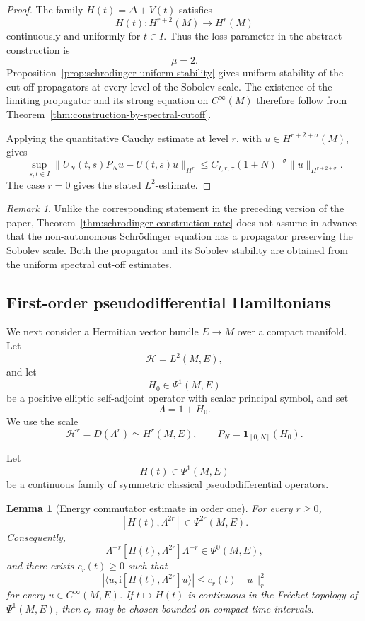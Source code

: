 \documentclass[11pt]{amsart}
\theoremstyle{plain}
\newtheorem{lemma}[theorem]{Lemma}
\theoremstyle{definition}
\theoremstyle{remark}
\newtheorem{remark}[theorem]{Remark}
\newcommand{\Hilb}{\mathcal H}
\begin{document}
\begin{proof}
The family \(H(t)=\Delta+V(t)\) satisfies
\[
H(t):H^{r+2}(M)\longrightarrow H^{r}(M)
\]
continuously and uniformly for \(t\in I\). Thus the loss parameter in the
abstract construction is
\[
\mu=2.
\]
Proposition~\ref{prop:schrodinger-uniform-stability} gives uniform stability
of the cut-off propagators at every level of the Sobolev scale. The existence
of the limiting propagator and its strong equation on \(C^{\infty}(M)\)
therefore follow from
Theorem~\ref{thm:construction-by-spectral-cutoff}.

Applying the quantitative Cauchy estimate at level \(r\), with
\(u\in H^{r+2+\sigma}(M)\), gives
\[
\sup_{s,t\in I}
\|U_{N}(t,s)P_{N}u-U(t,s)u\|_{H^{r}}
\leq
C_{I,r,\sigma}(1+N)^{-\sigma}
\|u\|_{H^{r+2+\sigma}}.
\]
The case \(r=0\) gives the stated \(L^{2}\)-estimate.
\end{proof}

\begin{remark}
\label{rem:schrodinger-no-prior-propagator}
Unlike the corresponding statement in the preceding version of the paper,
Theorem~\ref{thm:schrodinger-construction-rate} does not assume in advance
that the non-autonomous Schrödinger equation has a propagator preserving the
Sobolev scale. Both the propagator and its Sobolev stability are obtained
from the uniform spectral cut-off estimates.
\end{remark}


\subsection{First-order pseudodifferential Hamiltonians}
\label{subsec:first-order-pseudodifferential-hamiltonians}

We next consider a Hermitian vector bundle \(E\to M\) over a compact manifold.
Let
\[
\mathcal{H}=L^{2}(M,E),
\]
and let
\[
H_0\in\Psi^1(M,E)
\]
be a positive elliptic self-adjoint operator with scalar principal
symbol, and set
\[
\Lambda=1+H_0.
\]
We use the scale
\[
\Hilb^r=D(\Lambda^r)\simeq H^r(M,E),
\qquad
P_N=\mathbf{1}_{[0,N]}(H_0).
\]

Let
\[
H(t)\in\Psi^{1}(M,E)
\]
be a continuous family of symmetric classical pseudodifferential operators.

\begin{lemma}[Energy commutator estimate in order one]
\label{lem:first-order-energy-commutator}
For every \(r\geq 0\),
\[
[H(t),\Lambda^{2r}]
\in
\Psi^{2r}(M,E).
\]
Consequently,
\[
\Lambda^{-r}[H(t),\Lambda^{2r}]\Lambda^{-r}
\in
\Psi^{0}(M,E),
\]
and there exists \(c_{r}(t)\geq 0\) such that
\[
\left|
\langle u,\mathrm{i}[H(t),\Lambda^{2r}]u\rangle
\right|
\leq
c_{r}(t)\|u\|_{r}^{2}
\]
for every \(u\in C^{\infty}(M,E)\).
If \(t\mapsto H(t)\) is continuous in the Fréchet topology of
\(\Psi^{1}(M,E)\), then \(c_{r}\) may be chosen bounded on compact time
intervals.
\end{lemma}
\end{document}
